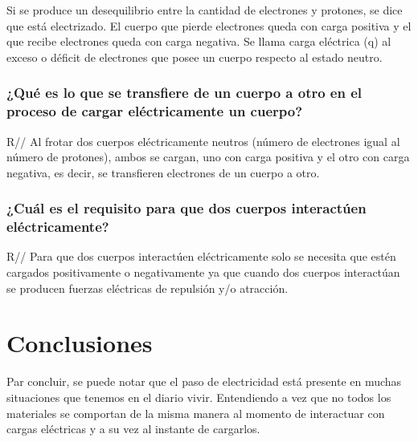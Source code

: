 \documentclass[letterpaper, 12pt]{report}
\begin{document}
Si se produce un desequilibrio entre la cantidad de electrones y
protones, se dice que está electrizado. El cuerpo que pierde electrones
queda con carga positiva y el que recibe electrones queda con carga negativa.
Se llama carga eléctrica (q) al exceso o déficit de electrones que posee un
cuerpo respecto al estado neutro.~\cite{CargaElectrica}

\subsubsection{¿Qué es lo que se transfiere de un cuerpo a otro en
	el proceso de cargar eléctricamente un cuerpo?}

R// Al frotar dos cuerpos eléctricamente neutros (número de electrones igual
al número de protones), ambos se cargan, uno con carga positiva y el otro con
carga negativa, es decir, se transfieren electrones de un cuerpo a otro.
~\cite{ElectrizacionWikipedia}

\subsubsection{¿Cuál es el requisito para que dos cuerpos interactúen
	eléctricamente?}

R// Para que dos cuerpos interactúen eléctricamente solo se necesita que
estén cargados positivamente o negativamente ya que cuando dos cuerpos
interactúan se producen fuerzas eléctricas de repulsión y/o atracción.
~\cite{TransferenciaParticulas}

\section{Conclusiones}

Par concluir, se puede notar que el paso de electricidad está
presente en muchas situaciones que tenemos en el diario vivir. Entendiendo a
vez que no todos los materiales se comportan de la misma manera al momento
de interactuar con cargas eléctricas y a su vez al instante de cargarlos.

\newpage

\end{document}
